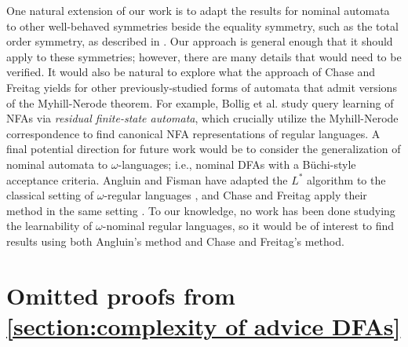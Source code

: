 \documentclass[runningheads]{llncs}
\newif\ifappendix
\begin{document}
One natural extension of our work is to adapt the results for nominal automata to other well-behaved symmetries beside the equality symmetry, such as the total order symmetry, as described in \cite{bojanczyk-klin-lasota:automata-theory-in-nominal-sets}. 
Our approach is general enough that it should apply to these symmetries; however, there are many details that would need to be verified. 
It would also be natural to explore what the approach of Chase and Freitag yields for other previously-studied forms of automata that admit versions of the Myhill-Nerode theorem. 
For example, Bollig et al. \cite{bollig-etal:learning-NFA} study query learning of NFAs via \textit{residual finite-state automata}, which crucially utilize the Myhill-Nerode correspondence to find canonical NFA representations of regular languages. 
A final potential direction for future work would be to consider the generalization of nominal automata to $\omega$-languages; i.e., nominal DFAs with a B\"uchi-style acceptance criteria. 
Angluin and Fisman have adapted the $L^*$ algorithm to the classical setting of $\omega$-regular languages \cite{angluin-fisman:learning-regular-omega-languages}, and Chase and Freitag apply their method in the same setting \cite{chase-freitag:bounds-in-query-learning}.
To our knowledge, no work has been done studying the learnability of $\omega$-nominal regular languages, so it would be of interest to find results using both Angluin's method and Chase and Freitag's method. 

%




%
%


%

\ifappendix

\newpage
\appendix


\section{Omitted proofs from \autoref{section:complexity of advice DFAs}} \label{appendix:advice DFAs omitted proofs}
\end{document}

